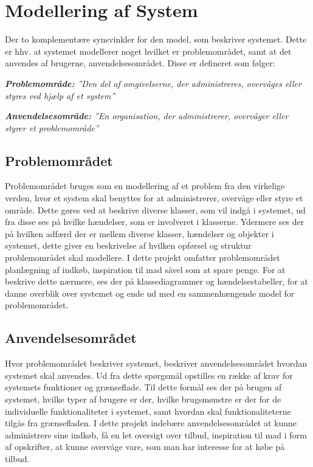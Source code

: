\section{Modellering af System}
Der to komplementære synsvinkler for den model, som beskriver systemet. 
Dette er hhv. at systemet modellerer noget hvilket er problemområdet, samt at det anvendes af brugerne, anvendelsesområdet. 
Disse er defineret som følger:

\textit{\textbf{Problemområde:} ''Den del af omgivelserne, der administreres, overvåges eller styres ved hjælp af et system''}

\textit{\textbf{Anvendelsesområde:} ''En organisation, der administrerer, overvåger eller styrer et problemområde''}\citep{OOA&D2001}
\subsection{Problemområdet}
Problemområdet bruges som en modellering af et problem fra den virkelige verden, hvor et system skal benyttes for at administrerer, overvåge eller styre et område. 
Dette gøres ved at beskrive diverse klasser, som vil indgå i systemet, ud fra disse ses på hvilke hændelser, som er involveret i klasserne.
Ydermere ses der på hvilken adfærd der er mellem diverse klasser, hændelser og objekter i systemet, dette giver en beskrivelse af hvilken opførsel og struktur problemområdet skal modellere.
I dette projekt omfatter problemområdet planlægning af indkøb, inspiration til mad såvel som at spare penge.
For at beskrive dette nærmere, ses der på klassediagrammer og hændelsestabeller, for at danne overblik over systemet og ende ud med en sammenhængende model for problemområdet.
\subsection{Anvendelsesområdet}
Hvor problemområdet beskriver systemet, beskriver anvendelsesområdet hvordan systemet skal anvendes.
Ud fra dette spørgsmål opstilles en række af krav for systemets funktioner og grænseflade.
Til dette formål ses der på brugen af systemet, hvilke typer af brugere er der, hvilke brugsmønstre er der for de individuelle funktionaliteter i systemet, samt hvordan skal funktionaliteterne tilgås fra grænsefladen.
I dette projekt indebære anvendelsesområdet at kunne administrere sine indkøb, få en let oversigt over tilbud, inspiration til mad i form af opskrifter, at kunne overvåge vare, som man har interesse for at købe på tilbud.

